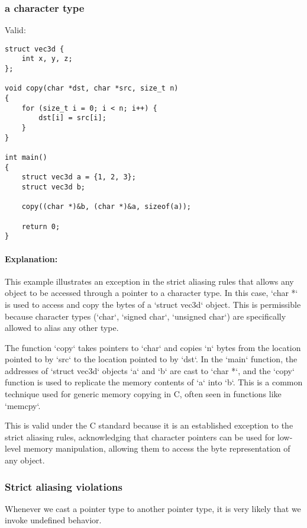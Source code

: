 \documentclass[12pt]{article}
\begin{document}
\subsubsection{a character type}

Valid:

\begin{lstlisting}
struct vec3d {
    int x, y, z;
};

void copy(char *dst, char *src, size_t n)
{
    for (size_t i = 0; i < n; i++) {
        dst[i] = src[i];
    }
}

int main()
{
    struct vec3d a = {1, 2, 3};
    struct vec3d b;

    copy((char *)&b, (char *)&a, sizeof(a));

    return 0;
}
\end{lstlisting}


\paragraph{Explanation:}
This example illustrates an exception in the strict aliasing rules that allows any object to be accessed through a pointer to a character type. In this case, `char *` is used to access and copy the bytes of a `struct vec3d` object. This is permissible because character types (`char`, `signed char`, `unsigned char`) are specifically allowed to alias any other type.

The function `copy` takes pointers to `char` and copies `n` bytes from the location pointed to by `src` to the location pointed to by `dst`. In the `main` function, the addresses of `struct vec3d` objects `a` and `b` are cast to `char *`, and the `copy` function is used to replicate the memory contents of `a` into `b`. This is a common technique used for generic memory copying in C, often seen in functions like `memcpy`.

This is valid under the C standard because it is an established exception to the strict aliasing rules, acknowledging that character pointers can be used for low-level memory manipulation, allowing them to access the byte representation of any object.

\subsubsection{Strict aliasing violations}

Whenever we cast a pointer type to another pointer type,
it is very likely that we invoke undefined behavior.
\end{document}
